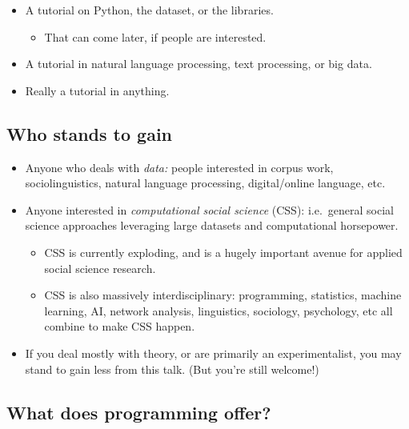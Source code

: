 \documentclass[11pt]{article}
\providecommand{\tightlist}{%
      \setlength{\itemsep}{0pt}\setlength{\parskip}{0pt}}
\begin{document}
\begin{itemize}
\tightlist
\item
  A tutorial on Python, the dataset, or the libraries.

  \begin{itemize}
  \tightlist
  \item
    That can come later, if people are interested.
  \end{itemize}
\item
  A tutorial in natural language processing, text processing, or big
  data.
\item
  Really a tutorial in anything.
\end{itemize}

    \hypertarget{who-stands-to-gain}{%
\subsection{Who stands to gain}\label{who-stands-to-gain}}

\begin{itemize}
\tightlist
\item
  Anyone who deals with \emph{data:} people interested in corpus work,
  sociolinguistics, natural language processing, digital/online
  language, etc.
\item
  Anyone interested in \emph{computational social science} (CSS):
  i.e.~general social science approaches leveraging large datasets and
  computational horsepower.

  \begin{itemize}
  \tightlist
  \item
    CSS is currently exploding, and is a hugely important avenue for
    applied social science research.
  \item
    CSS is also massively interdisciplinary: programming, statistics,
    machine learning, AI, network analysis, linguistics, sociology,
    psychology, etc all combine to make CSS happen.
  \end{itemize}
\item
  If you deal mostly with theory, or are primarily an experimentalist,
  you may stand to gain less from this talk. (But you're still welcome!)
\end{itemize}

    \hypertarget{what-does-programming-offer}{%
\subsection{What does programming
offer?}\label{what-does-programming-offer}}
\end{document}
